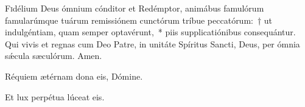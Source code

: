 \documentclass[vesperale_romanum]{subfiles}
\begin{document}
\lettrine{F}{i}délium Deus ó\-mnium cónditor et Red\-ém\-ptor, animábus famulórum famularúmque tuárum remissiónem cun\-ctórum tríbue peccatórum:~† ut indulgéntiam, quam semper optavérunt,~* piis supplicatiónibus consequántur. Qui vivis et regnas cum Deo Patre, in unitáte Spíritus Sancti, Deus, per ómnia sǽcula sæculórum.
\rr Amen.

\label{vv_requiem_etc}

\vv Réquiem ætérnam dona eis, Dómine.

\rr Et lux perpétua lúceat eis.


\end{document}

